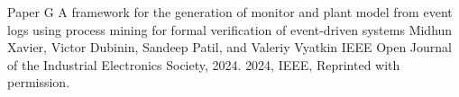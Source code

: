 \documentclass[12pt,a4paper,openright,final,twoside]{cseethesis}
\begin{document}

\makepaperaccepted
  {\paperheader}
  {\papertitle}
  {\paperauthorstring}
  {}
  {\copyrightstring}



\def\paperheader{Paper G}
\def\papertitle{A framework for the generation of monitor and plant model from event logs using process mining for formal verification of event-driven systems}
\def\paperauthorstring{Midhun Xavier, Victor Dubinin, Sandeep Patil, and Valeriy Vyatkin}
\def\referencestring{IEEE Open Journal of the Industrial Electronics Society, 2024.}
\def\copyrightstring{2024, IEEE, Reprinted with permission.}


\makepaperaccepted
  {\paperheader}
  {\papertitle}
  {\paperauthorstring}
  {\referencestring}
  {\copyrightstring}






\printglossary[type=\acronymtype]
\end{document}
